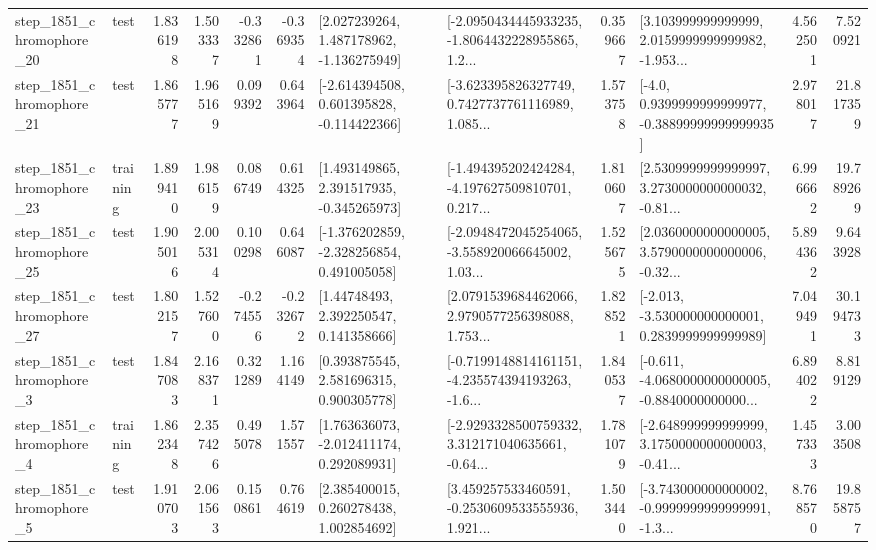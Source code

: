 \begin{tabular}{llrrrrllrlrr}
 step\_1851\_chromophore\_20 &      test &      1.836198 &    1.503337 &     -0.332861 & -0.369354 &    [2.027239264, 1.487178962, -1.136275949] &  [-2.0950434445933235, -1.8064432228955865, 1.2... &       0.359667 &  [3.103999999999999, 2.0159999999999982, -1.953... &            4.562501 &          7.520921 \\
 step\_1851\_chromophore\_21 &      test &      1.865777 &    1.965169 &      0.099392 &  0.643964 &   [-2.614394508, 0.601395828, -0.114422366] &  [-3.623395826327749, 0.7427737761116989, 1.085... &       1.573758 &   [-4.0, 0.9399999999999977, -0.38899999999999935] &            2.978017 &         21.817359 \\
 step\_1851\_chromophore\_23 &  training &      1.899410 &    1.986159 &      0.086749 &  0.614325 &    [1.493149865, 2.391517935, -0.345265973] &  [-1.494395202424284, -4.197627509810701, 0.217... &       1.810607 &  [2.5309999999999997, 3.2730000000000032, -0.81... &            6.996662 &         19.789269 \\
 step\_1851\_chromophore\_25 &      test &      1.905016 &    2.005314 &      0.100298 &  0.646087 &   [-1.376202859, -2.328256854, 0.491005058] &  [-2.0948472045254065, -3.558920066645002, 1.03... &       1.525675 &  [2.0360000000000005, 3.5790000000000006, -0.32... &            5.894362 &          9.643928 \\
 step\_1851\_chromophore\_27 &      test &      1.802157 &    1.527600 &     -0.274556 & -0.232672 &      [1.44748493, 2.392250547, 0.141358666] &  [2.0791539684462066, 2.9790577256398088, 1.753... &       1.828521 &   [-2.013, -3.530000000000001, 0.2839999999999989] &            7.049491 &         30.194733 \\
  step\_1851\_chromophore\_3 &      test &      1.847083 &    2.168371 &      0.321289 &  1.164149 &     [0.393875545, 2.581696315, 0.900305778] &  [-0.7199148814161151, -4.235574394193263, -1.6... &       1.840537 &  [-0.611, -4.0680000000000005, -0.8840000000000... &            6.894022 &          8.819129 \\
  step\_1851\_chromophore\_4 &  training &      1.862348 &    2.357426 &      0.495078 &  1.571557 &    [1.763636073, -2.012411174, 0.292089931] &  [-2.9293328500759332, 3.312171040635661, -0.64... &       1.781079 &  [-2.648999999999999, 3.1750000000000003, -0.41... &            1.457333 &          3.003508 \\
  step\_1851\_chromophore\_5 &      test &      1.910703 &    2.061563 &      0.150861 &  0.764619 &     [2.385400015, 0.260278438, 1.002854692] &  [3.459257533460591, -0.2530609533555936, 1.921... &       1.503440 &  [-3.743000000000002, -0.9999999999999991, -1.3... &            8.768570 &         19.858757 \\

\end{tabular}
